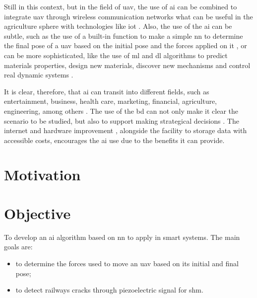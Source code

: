 Still in this context, but in the field of \gls*{uav}, the use of \gls*{ai} can be combined to integrate \gls*{uav} through wireless communication networks \citep{lahmeri2021} what can be useful in the agriculture sphere \citep{ahirwar2019} with technologies like \gls*{iot} \citep{verdouw2016,tzounis2017}.
Also, the use of the \gls*{ai} can be subtle, such as the use of a built-in \matlab function to make a simple \gls*{nn} to determine the final pose of a \gls*{uav} based on the initial pose and the forces applied on it \citep{geronel2023}, or can be more sophisticated, like the use of \gls*{ml} and \gls*{dl} algorithms to predict materials properties, design new materials, discover new mechanisms and control real dynamic systems \citep{guo2021,assilian1974}.

It is clear, therefore, that \gls*{ai} can transit into different fields, such as entertainment, business, health care, marketing, financial, agriculture, engineering, among others \citep{ruiz-real2020,yu2018,davenport2019,verma2021,mhlanga2020,pannu2015,ghatrehsamani2023}. 
The use of the \gls*{bd} can not only make it clear the scenario to be studied, but also to support making strategical decisions \citep{jeble2018,koscielniak2015}.
The internet and hardware improvement \citep{baji2018}, alongside the facility to storage data with accessible costs, encourages the \gls*{ai} use due to the benefits it can provide.

\section{Motivation}

\section{Objective}

To develop an \gls*{ai} algorithm based on \gls*{nn} to apply in smart systems.
The main goals are:
%
\begin{itemize}
    \item to determine the forces used to move an \gls*{uav} based on its initial and final pose;
    \item to detect railways cracks through piezoelectric signal for \gls*{shm}.
\end{itemize}